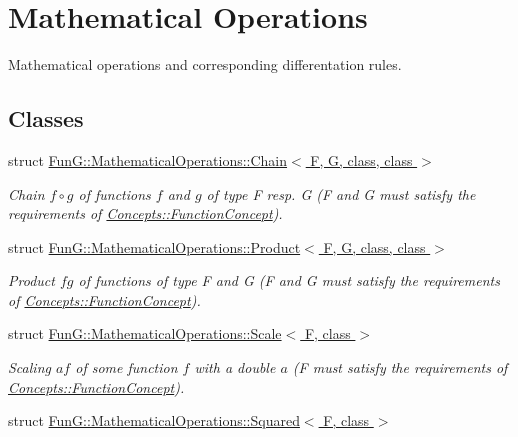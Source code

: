 \hypertarget{group__MathematicalOperationsGroup}{\section{\-Mathematical \-Operations}
\label{group__MathematicalOperationsGroup}
}


\-Mathematical operations and corresponding differentation rules.  


\subsection*{\-Classes}
\begin{DoxyCompactItemize}
\item 
struct \hyperlink{structFunG_1_1MathematicalOperations_1_1Chain}{\-Fun\-G\-::\-Mathematical\-Operations\-::\-Chain$<$ F, G, class, class $>$}
\begin{DoxyCompactList}\small\item\em \-Chain $ f\circ g $ of functions $f$ and $g$ of type \-F resp. \-G (\-F and \-G must satisfy the requirements of \hyperlink{structFunG_1_1Concepts_1_1FunctionConcept}{\-Concepts\-::\-Function\-Concept}). \end{DoxyCompactList}\item 
struct \hyperlink{structFunG_1_1MathematicalOperations_1_1Product}{\-Fun\-G\-::\-Mathematical\-Operations\-::\-Product$<$ F, G, class, class $>$}
\begin{DoxyCompactList}\small\item\em \-Product $fg$ of functions of type \-F and \-G (\-F and \-G must satisfy the requirements of \hyperlink{structFunG_1_1Concepts_1_1FunctionConcept}{\-Concepts\-::\-Function\-Concept}). \end{DoxyCompactList}\item 
struct \hyperlink{structFunG_1_1MathematicalOperations_1_1Scale}{\-Fun\-G\-::\-Mathematical\-Operations\-::\-Scale$<$ F, class $>$}
\begin{DoxyCompactList}\small\item\em \-Scaling $ af $ of some function $ f $ with a double $ a $ (\-F must satisfy the requirements of \hyperlink{structFunG_1_1Concepts_1_1FunctionConcept}{\-Concepts\-::\-Function\-Concept}). \end{DoxyCompactList}\item 
struct \hyperlink{structFunG_1_1MathematicalOperations_1_1Squared}{\-Fun\-G\-::\-Mathematical\-Operations\-::\-Squared$<$ F, class $>$}

\end{DoxyCompactItemize}
